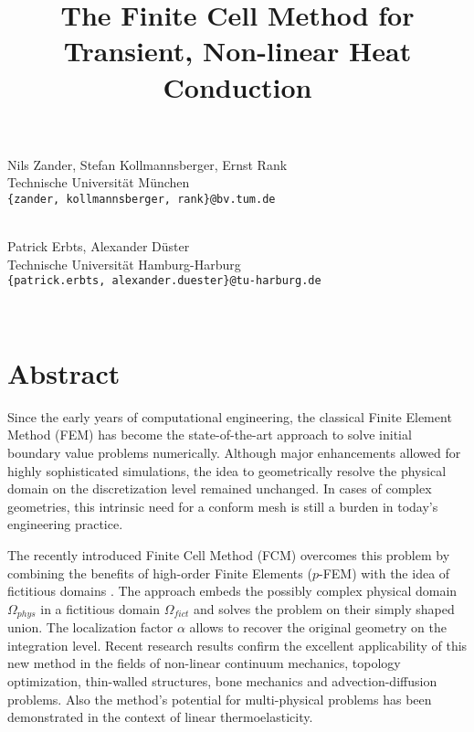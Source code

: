 \title{The Finite Cell Method for Transient, Non-linear Heat Conduction}
 \author{} \institute{}
\maketitle
\begin{center}

{\large Nils Zander, Stefan Kollmannsberger, Ernst Rank}\\
Technische Universit\"{a}t M\"{u}nchen\\
{\tt \{zander, kollmannsberger, rank\}@bv.tum.de}

\\

{\large Patrick Erbts, Alexander D\"{u}ster}\\
Technische Universit\"{a}t Hamburg-Harburg\\
{\tt \{patrick.erbts, alexander.duester\}@tu-harburg.de}

\\



\end{center}

\section*{Abstract}

Since the early years of computational engineering, the classical Finite
Element Method (FEM) has become the state-of-the-art approach to solve initial
boundary value problems numerically. 
Although major enhancements allowed for highly sophisticated
simulations, the idea to geometrically
resolve the physical domain on the discretization level remained unchanged.
In cases of complex geometries, this intrinsic need for a conform mesh
is still a burden in today's engineering practice.


The recently introduced Finite Cell Method (FCM) overcomes this problem by
combining the benefits of high-order Finite Elements ($p$-FEM) with the idea of
fictitious domains \cite{Parvizian:07.1}.
The approach embeds  the possibly complex physical domain $\Omega_{phys}$
in a fictitious domain $\Omega_{fict}$ and solves the problem on their simply
shaped union. 
The localization factor $\alpha$ allows to recover the original geometry on the 
integration level. 
Recent research results confirm the excellent applicability
of this new method in the fields of
non-linear continuum mechanics, 
topology optimization, 
thin-walled structures, 
bone mechanics
and advection-diffusion problems.
Also the method's potential for multi-physical problems has been demonstrated
in the context of linear thermoelasticity.

